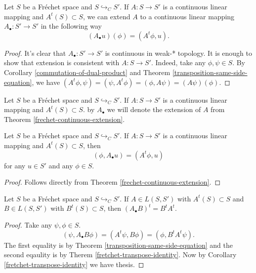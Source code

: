\documentclass[main.tex]{subfiles}
\begin{document}
\begin{theorem}
\label{frechet-continuous-extension}
Let $S$ be a Fr\'echet space and $S \hookrightarrow_C S'$. If $A:S\to S'$ is a continuous linear mapping and $A^t(S)\subset S$, we can extend $A$ to a continuous linear mapping $A_{\bullet}:S'\to S'$ in the following way
\begin{equation}
(A_\bullet u)(\phi) = (A^t \phi, u). 
\end{equation}
\end{theorem}
\begin{proof}
It's clear that $A_\bullet:S'\to S'$ is continuous in weak-* topology. It is enough to show that extension is consistent with $A:S\to S'$. Indeed, take any $\phi, \psi\in S$. By Corollary \ref{commutation-of-dual-product} and Theorem \ref{transposition-same-side-equation}, we have $(A^t \phi, \psi) = (\psi, A^t\phi) = (\phi, A\psi) = (A\psi)(\phi)$.
\end{proof}
\begin{definition}
Let $S$ be a Fr\'echet space and $S \hookrightarrow_C S'$. If $A:S\to S'$ is a continuous linear mapping and $A^t(S)\subset S$. by $A_\bullet$ we will denote the extension of $A$ from Theorem \ref{frechet-continuous-extension}.
\end{definition}
\begin{remark}
\label{frechet-composition-easy-rule}
Let $S$ be a Fr\'echet space and $S \hookrightarrow_C S'$. If $A:S\to S'$ is a continuous linear mapping and $A^t(S)\subset S$, then
\begin{equation}
(\phi, A_\bullet u) = (A^t\phi, u)
\end{equation}
for any $u\in S'$ and any $\phi\in S$.
\begin{proof}
Follows directly from Theorem \ref{frechet-continuous-extension}.
\end{proof}
\end{remark}
\begin{theorem}
\label{fretchet-transposition-composition}
Let $S$ be a Fr\'echet space and $S \hookrightarrow_C S'$. If $A\in L(S,S')$ with $A^t(S)\subset S$ and $B\in L(S, S')$ with $B^t(S)\subset S$, then $(A_\bullet B)^t = B^t A^t$.
\end{theorem}
\begin{proof}
Take any $\psi, \phi\in S$.
\begin{equation}
(\psi, A_\bullet B\phi) = (A^t\psi, B\phi) = (\phi, B^t A^t\psi).
\end{equation}
The first equality is by Theorem \ref{transposition-same-side-equation} and the second eqaulity is by Therem \ref{fretchet-transpose-identity}. Now by Corollary \ref{fretchet-transpose-identity} we have thesis.
\end{proof}
\end{document}
